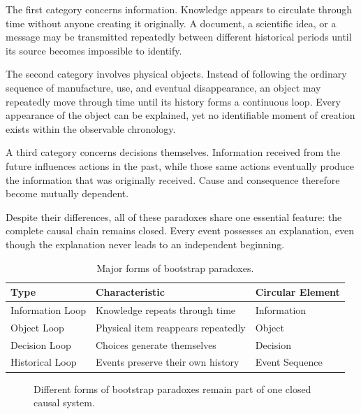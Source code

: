 \documentclass[12pt,oneside,openany]{book}
\begin{document}
The first category concerns information. Knowledge appears to circulate through
time without anyone creating it originally. A document, a scientific idea, or
a message may be transmitted repeatedly between different historical periods
until its source becomes impossible to identify.

The second category involves physical objects. Instead of following the
ordinary sequence of manufacture, use, and eventual disappearance, an object
may repeatedly move through time until its history forms a continuous loop.
Every appearance of the object can be explained, yet no identifiable moment of
creation exists within the observable chronology.

A third category concerns decisions themselves. Information received from the
future influences actions in the past, while those same actions eventually
produce the information that was originally received. Cause and consequence
therefore become mutually dependent.

Despite their differences, all of these paradoxes share one essential feature:
the complete causal chain remains closed. Every event possesses an explanation,
even though the explanation never leads to an independent beginning.

\begin{table}[H]
\centering
\begin{tabular}{|p{4.3cm}|p{4.2cm}|p{3.5cm}|}
\hline
\textbf{Type} & \textbf{Characteristic} & \textbf{Circular Element}\\
\hline
Information Loop & Knowledge repeats through time & Information\\
\hline
Object Loop & Physical item reappears repeatedly & Object\\
\hline
Decision Loop & Choices generate themselves & Decision\\
\hline
Historical Loop & Events preserve their own history & Event Sequence\\
\hline
\end{tabular}
\caption{Major forms of bootstrap paradoxes.}
\end{table}

\begin{figure}[H]
\centering
{}
\caption{Different forms of bootstrap paradoxes remain part of one closed causal system.}
\end{figure}
\end{document}
